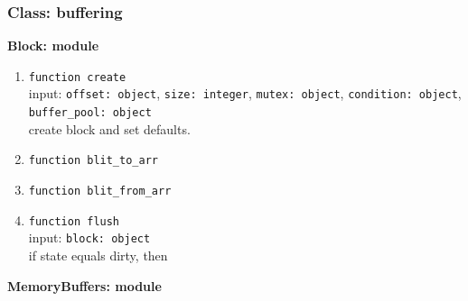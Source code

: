 \subsubsection{Class: buffering}
\textbf{Block: module}
\begin{enumerate}
    \item \verb|function create| \\
    input: \verb|offset: object|, \verb|size: integer|, \verb|mutex: object|, \verb|condition: object|, \verb|buffer_pool: object| \\
    create block and set defaults.
    \item \verb|function blit_to_arr| 
    \item \verb|function blit_from_arr| 
    \item \verb|function flush| \\
    input: \verb|block: object| \\
    if state equals dirty, then 
\end{enumerate}
\textbf{MemoryBuffers: module}
